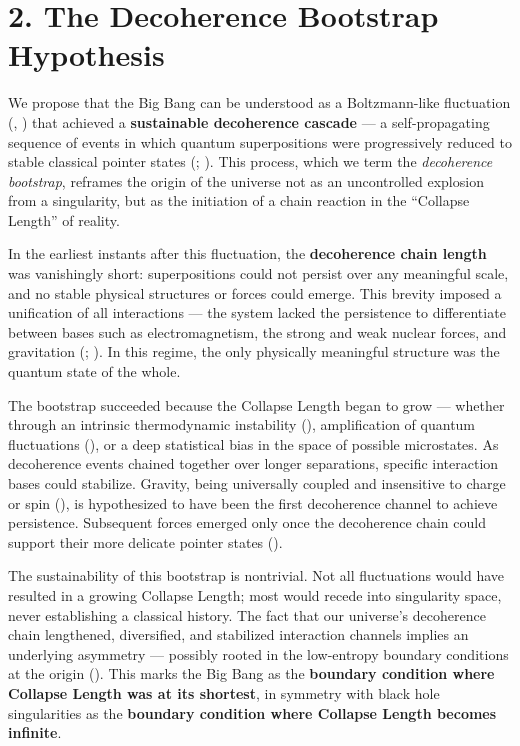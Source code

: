 \documentclass[
]{article}
\begin{document}
\section{2. The Decoherence Bootstrap
Hypothesis}\label{the-decoherence-bootstrap-hypothesis}

We propose that the Big Bang can be understood as a Boltzmann-like
fluctuation (,
) that achieved a
\textbf{sustainable decoherence cascade} --- a self-propagating sequence
of events in which quantum superpositions were progressively reduced to
stable classical pointer states (;
). This process,
which we term the \emph{decoherence bootstrap}, reframes the origin of
the universe not as an uncontrolled explosion from a singularity, but as
the initiation of a chain reaction in the ``Collapse Length'' of
reality.

In the earliest instants after this fluctuation, the \textbf{decoherence
chain length} was vanishingly short: superpositions could not persist
over any meaningful scale, and no stable physical structures or forces
could emerge. This brevity imposed a unification of all interactions ---
the system lacked the persistence to differentiate between bases such as
electromagnetism, the strong and weak nuclear forces, and gravitation
(;
). In this regime, the only
physically meaningful structure was the quantum state of the whole.

The bootstrap succeeded because the Collapse Length began to grow ---
whether through an intrinsic thermodynamic instability
(),
amplification of quantum fluctuations
(), or a deep
statistical bias in the space of possible microstates. As decoherence
events chained together over longer separations, specific interaction
bases could stabilize. Gravity, being universally coupled and
insensitive to charge or spin (), is hypothesized to have been the first decoherence
channel to achieve persistence. Subsequent forces emerged only once the
decoherence chain could support their more delicate pointer states
().

The sustainability of this bootstrap is nontrivial. Not all fluctuations
would have resulted in a growing Collapse Length; most would recede into
singularity space, never establishing a classical history. The fact that
our universe's decoherence chain lengthened, diversified, and stabilized
interaction channels implies an underlying asymmetry --- possibly rooted
in the low-entropy boundary conditions at the origin
(). This marks the Big Bang as
the \textbf{boundary condition where Collapse Length was at its
shortest}, in symmetry with black hole singularities as the
\textbf{boundary condition where Collapse Length becomes infinite}.
\end{document}
